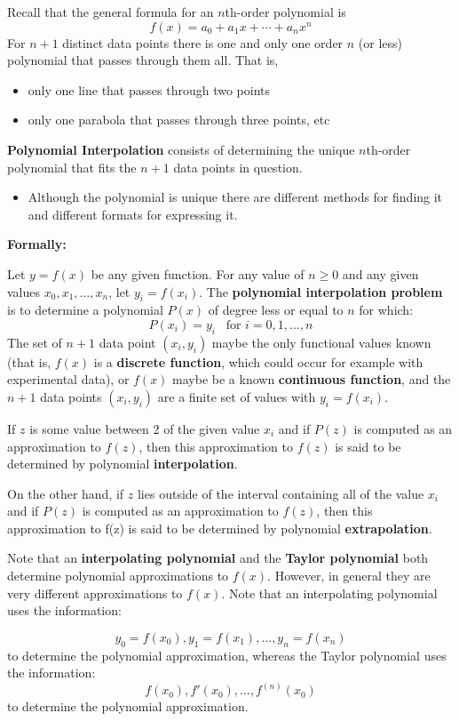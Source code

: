 \documentclass [titlepage,12pt,letter] {article}
\begin{document}
Recall that the general formula for an $n$th-order polynomial is
\[
f(x) = a_0 + a_1x + \dotsm + a_nx^n
\]
\noindent 
For $n+1$ distinct data points there is one and only one order $n$ (or less) polynomial that passes through them all. That is,
\begin{itemize}
\item{only one line that passes through two points}
\item{only one parabola that passes through three points, etc}
\end{itemize}
{\bf Polynomial Interpolation} consists of determining the unique $n$th-order polynomial that fits the $n+1$ data points in question.
\begin{itemize}
\item{Although the polynomial is unique there are different methods for finding it and different formats for expressing it.}
\end{itemize}

\noindent
{\bf Formally:}

Let $y=f(x)$ be any given function. For any value of $n \geq 0$ and any given values 
$x_0, x_1, \dots, x_n$, let $y_i = f(x_i)$. The {\bf polynomial interpolation problem} 
is to determine a polynomial $P(x)$ of degree less or equal to $n$ for which: 
\[
P(x_i) = y_i \;\;\; \mbox{for } i=0,1,\dots,n 
\]
\noindent 
The set of $n+1$ data point $(x_i,y_i)$ maybe the only functional values known (that is, $f(x)$ is 
a {\bf discrete function}, which could occur for example with experimental data), or $f(x)$ maybe be a known {\bf continuous function}, and the $n+1$ data points $(x_i, y_i)$ are a finite set of values with $y_i = f(x_i)$. 

If $z$ is some value between 2 of the given value $x_i$ and if $P(z)$ is computed as an approximation to $f(z)$, then this approximation to $f(z)$ is said to be determined by polynomial {\bf interpolation}. 

On the other hand, if $z$ lies outside of the interval containing all of the value $x_i$ and if $P(z)$ is computed as an approximation to $f(z)$, then this approximation to f(z) is said to be determined by polynomial {\bf extrapolation}. 

Note that an {\bf interpolating polynomial} and the {\bf Taylor polynomial} both determine polynomial approximations to $f(x)$. However, in general they are very different approximations to $f(x)$. Note that an interpolating polynomial uses the information: 

\[
y_0 = f(x_0), y_1 = f(x_1), \dots, y_n = f(x_n)
\]
\noindent 
to determine the polynomial approximation, whereas the Taylor polynomial uses the information: 
\[
f(x_0), f'(x_0), \dots, f^{(n)}(x_0)
\]
\noindent 
to determine the polynomial approximation. 
\end{document}
